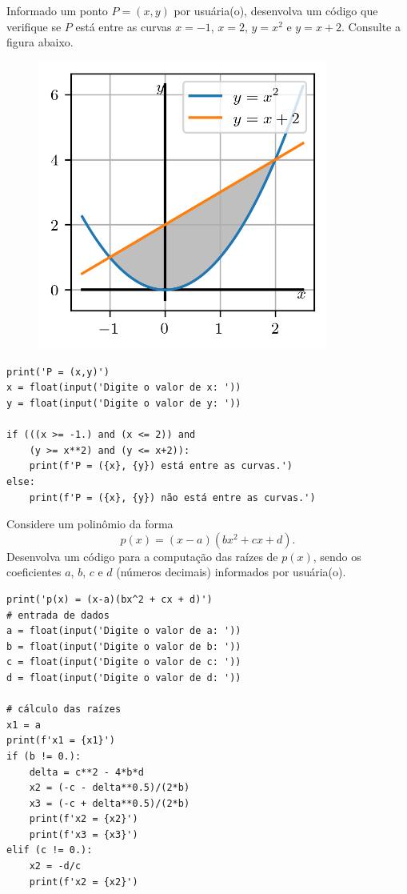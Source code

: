 \begin{exer}\label{cap_progest_sec_ramifica:exer:entre_curvas}
  Informado um ponto $P = (x, y)$ por usuária(o), desenvolva um código que verifique se $P$ está entre as curvas $x = -1$, $x = 2$, $y = x^2$ e $y = x+2$. Consulte a figura abaixo.
\begin{figure}[H]
  \centering
  \includegraphics[width=3.75in]{./cap_progest/dados/fig_exer_entre_curvas/fig.png}
\end{figure}
\end{exer}
\begin{resp}

\begin{lstlisting}
print('P = (x,y)')
x = float(input('Digite o valor de x: '))
y = float(input('Digite o valor de y: '))

if (((x >= -1.) and (x <= 2)) and
    (y >= x**2) and (y <= x+2)):
    print(f'P = ({x}, {y}) está entre as curvas.')
else:
    print(f'P = ({x}, {y}) não está entre as curvas.')
\end{lstlisting}

\end{resp}

\begin{exer}
  Considere um polinômio da forma
  \begin{equation}
    p(x) = (x-a)(bx^2 + cx + d).
  \end{equation}
  Desenvolva um código para a computação das raízes de $p(x)$, sendo os coeficientes $a$, $b$, $c$ e $d$ (números decimais) informados por usuária(o).
\end{exer}
\begin{resp}

\begin{lstlisting}
print('p(x) = (x-a)(bx^2 + cx + d)')
# entrada de dados
a = float(input('Digite o valor de a: '))
b = float(input('Digite o valor de b: '))
c = float(input('Digite o valor de c: '))
d = float(input('Digite o valor de d: '))

# cálculo das raízes
x1 = a
print(f'x1 = {x1}')
if (b != 0.):
    delta = c**2 - 4*b*d
    x2 = (-c - delta**0.5)/(2*b)
    x3 = (-c + delta**0.5)/(2*b)
    print(f'x2 = {x2}')
    print(f'x3 = {x3}')
elif (c != 0.):
    x2 = -d/c
    print(f'x2 = {x2}')
\end{lstlisting}

\end{resp}

